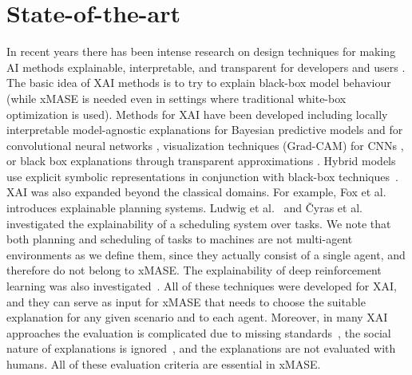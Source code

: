 \documentclass[letterpaper]{article} %
\begin{document}
\section{State-of-the-art}
In recent years there has been intense research on  design techniques for making AI methods explainable, interpretable, and transparent for developers and users \cite{carvalho2019machine}.
The basic idea of \ac{XAI} methods is to try to explain black-box model behaviour (while \ac{xMASE} is needed even in settings where traditional white-box optimization is used). Methods for \ac{XAI} have been developed including locally interpretable model-agnostic explanations for Bayesian predictive models \cite{Peltola2018LocalIM} and for convolutional neural networks \cite{Mishra2017LocalIM}, visualization techniques (Grad-CAM) for CNNs \cite{Selvaraju17}, or black box explanations through transparent approximations \cite{Lakkaraju17}. Hybrid models use explicit symbolic representations in conjunction with black-box techniques~\cite{hu2016harnessing,choi2019relative}. \ac{XAI} was also expanded beyond the classical domains. For example, Fox et al.~ introduces explainable planning systems. Ludwig et al.~ and {\v{C}}yras et al.~ investigated the explainability of a scheduling system over tasks. We note that both planning and scheduling of tasks to machines are not multi-agent environments as we define them, since they actually consist of a single agent, and therefore do not belong to \ac{xMASE}. 
The explainability of deep reinforcement learning was also investigated~\cite{Lee19}.
All of these techniques were developed for \ac{XAI},
and they can serve as input for \ac{xMASE} that needs to choose the suitable explanation for any given scenario and to each agent. Moreover, in many \ac{XAI} approaches the evaluation is complicated due to missing standards~\cite{pedreschi2019meaningful1}, the social nature of explanations is ignored~\cite{miller2018explanation}, and the explanations are not evaluated with humans. All of these evaluation criteria are essential in \ac{xMASE}.
\end{document}
